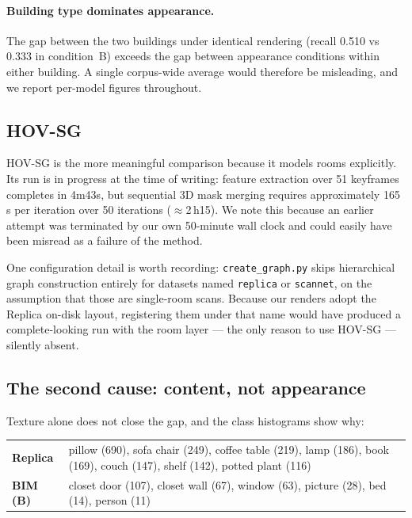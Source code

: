 \documentclass[11pt,a4paper]{article}
\begin{document}
\paragraph{Building type dominates appearance.} The gap between the two
buildings under identical rendering (recall 0.510 vs 0.333 in condition~B)
exceeds the gap between appearance conditions within either building. A single
corpus-wide average would therefore be misleading, and we report per-model
figures throughout.

\subsection{HOV-SG}

HOV-SG is the more meaningful comparison because it models rooms explicitly.
Its run is in progress at the time of writing: feature extraction over 51
keyframes completes in 4m43s, but sequential 3D mask merging requires
approximately 165\,s per iteration over 50 iterations ($\approx$2\,h15). We note
this because an earlier attempt was terminated by our own 50-minute wall clock
and could easily have been misread as a failure of the method.

One configuration detail is worth recording: \texttt{create\_graph.py} skips
hierarchical graph construction entirely for datasets named \texttt{replica} or
\texttt{scannet}, on the assumption that those are single-room scans. Because
our renders adopt the Replica on-disk layout, registering them under that name
would have produced a complete-looking run with the room layer --- the only
reason to use HOV-SG --- silently absent.

\subsection{The second cause: content, not appearance}
\label{sec:content}

Texture alone does not close the gap, and the class histograms show why:

\begin{center}
\small
\begin{tabular}{@{}lp{9.4cm}@{}}
\toprule
\textbf{Replica} & pillow (690), sofa chair (249), coffee table (219),
lamp (186), book (169), couch (147), shelf (142), potted plant (116) \\
\addlinespace
\textbf{BIM (B)} & closet door (107), closet wall (67), window (63),
picture (28), bed (14), person (11) \\
\bottomrule
\end{tabular}
\end{center}
\end{document}
